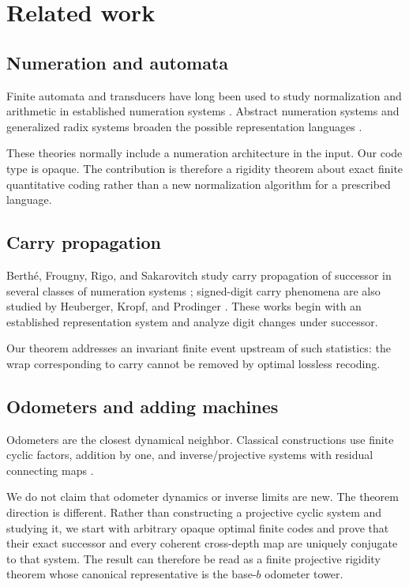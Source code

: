 \documentclass[11pt]{article}
\theoremstyle{definition}
\begin{document}
\section{Related work}

\subsection{Numeration and automata}

Finite automata and transducers have long been used to study normalization and arithmetic in established numeration systems \cite{Frougny1992,Frougny1999,FrougnySakarovitch2010}. Abstract numeration systems and generalized radix systems broaden the possible representation languages \cite{LecomteRigo2010,Rigo2014,AkiyamaPetho2002,AkiyamaEtAl2004}.

These theories normally include a numeration architecture in the input. Our code type is opaque. The contribution is therefore a rigidity theorem about exact finite quantitative coding rather than a new normalization algorithm for a prescribed language.

\subsection{Carry propagation}

Berth\'e, Frougny, Rigo, and Sakarovitch study carry propagation of successor in several classes of numeration systems \cite{BertheFrougnyRigoSakarovitch2020}; signed-digit carry phenomena are also studied by Heuberger, Kropf, and Prodinger \cite{HeubergerKropfProdinger2017}. These works begin with an established representation system and analyze digit changes under successor.

Our theorem addresses an invariant finite event upstream of such statistics: the wrap corresponding to carry cannot be removed by optimal lossless recoding.

\subsection{Odometers and adding machines}

Odometers are the closest dynamical neighbor. Classical constructions use finite cyclic factors, addition by one, and inverse/projective systems with residual connecting maps \cite{GrabnerLiardetTichy1995,BaratBertheLiardetThuswaldner2006}.

We do not claim that odometer dynamics or inverse limits are new. The theorem direction is different. Rather than constructing a projective cyclic system and studying it, we start with arbitrary opaque optimal finite codes and prove that their exact successor and every coherent cross-depth map are uniquely conjugate to that system. The result can therefore be read as a finite projective rigidity theorem whose canonical representative is the base-$b$ odometer tower.
\end{document}
